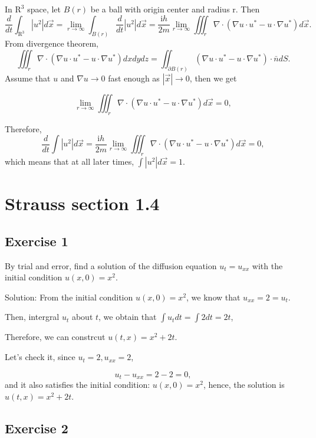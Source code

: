 \documentclass{article}
\begin{document}
            In $\mathrm{R}^3$ space, let $B(r)$ be a ball with origin center and radius r.
			Then \[ \frac{d}{dt}\int_{\mathrm{R^3} }^{}  \left | u^2 \right | d \vec{x }= \lim_{r \to \infty}\int_{B(r)}\frac{d}{dt} \left | u^2 \right | d \vec{x }= \frac{\mathrm{i}h}{2m}\lim_{r \to \infty}\iiint_{r}^{} \nabla \cdot (\nabla u \cdot u^* -u\cdot \nabla u^*)d \vec{x }.\]
			From divergence theorem,
			\[\iiint_{r}^{} \nabla \cdot (\nabla u \cdot u^* -u\cdot \nabla u^*)dx dy dz= \iint_{\partial B(r)}^{}(\nabla u \cdot u^* -u\cdot \nabla u^*) \cdot \bar{n} dS.	\]
			Assume that $u$ and $\nabla u \to 0$ fast enough as $\left | \vec{x} \right | \to 0$, then we get
		
		\[ \lim_{r \to \infty}\iiint_{r}^{} \nabla \cdot (\nabla u \cdot u^* -u\cdot \nabla u^*)d \vec{x } =0,\]

		Therefore, \[ \frac{d}{dt}\int \left | u^2 \right | d \vec{x }=\frac{\mathrm{i}h}{2m}\lim_{r \to \infty}\iiint_{r}^{} \nabla \cdot (\nabla u \cdot u^* -u\cdot \nabla u^*)d \vec{x }=0,\]
			which means that at all later times, $ \int \left | u^2 \right | d \vec{x } =1$.
		
\section{Strauss section 1.4}
\subsection{Exercise 1}
By trial and error, find a solution of the diffusion equation $u_t=u_{xx}$ with the initial condition $u(x,0)=x^2.$
		
		Solution: From the initial condition $u(x,0)=x^2$, we know that $u_{xx}=2=u_t$. 
		
		Then, intergral $u_{t}$ about $t$, we obtain that $\int u_{t} dt= \int 2 dt = 2t$,

		Therefore, we can constrcut $u(t,x)=x^2+2t$.

		Let's check it, since $u_{t}=2, u_{xx}=2$,

		\[u_{t}-u_{xx}=2-2=0,\] and it also satisfies the initial condition: $u(x,0)=x^2$, hence, the solution is $u(t,x)=x^2+2t$.

		\subsection{Exercise 2}
\end{document}
